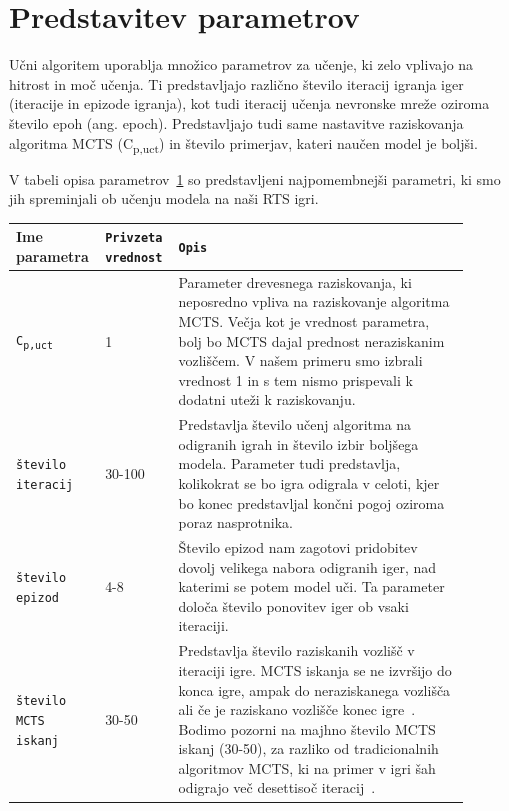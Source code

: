 \documentclass[a4paper, 12pt]{book}
\begin{document}
{\section{Predstavitev parametrov}
\label{parametri}
Učni algoritem uporablja množico parametrov za učenje, ki zelo vplivajo na hitrost in moč učenja.
Ti predstavljajo različno število iteracij igranja iger (iteracije in epizode igranja), kot tudi iteracij učenja nevronske mreže oziroma število epoh (ang. epoch).
Predstavljajo tudi same nastavitve raziskovanja algoritma MCTS (C\textsubscript{p,uct}) in število primerjav, kateri naučen model je boljši.

V tabeli opisa parametrov~\ref{tableParameters1} so predstavljeni najpomembnejši parametri, ki smo jih spreminjali ob učenju modela na naši RTS igri.
\begin{table}
	\begin{center}
		\begin{tabular}{p{0.15\linewidth}|p{0.13\linewidth}|p{0.62\linewidth}}
			Ime parametra                             & {\tt Privzeta vrednost} & {\tt Opis} \\ \hline
			{\tt C\textsubscript{p,uct}}               & 1 						& Parameter drevesnega raziskovanja, ki neposredno vpliva na raziskovanje algoritma MCTS. 
																				  Večja kot je vrednost parametra, bolj bo MCTS dajal prednost neraziskanim vozliščem. 
																				  V našem primeru smo izbrali vrednost 1 in s tem nismo prispevali k dodatni uteži k raziskovanju.\\
			{\tt število iteracij}                    & 30-100				    & Predstavlja število učenj algoritma na odigranih igrah in število izbir boljšega modela.
																				  Parameter tudi predstavlja, kolikokrat se bo igra odigrala v celoti, kjer bo konec predstavljal končni pogoj oziroma poraz nasprotnika.\\
			{\tt število epizod}                      & 4-8 					& Število epizod nam zagotovi pridobitev dovolj velikega nabora odigranih iger, nad katerimi se potem model uči.
																				  Ta parameter določa število ponovitev iger ob vsaki iteraciji.\\
			{\tt število MCTS iskanj}                 & 30-50					& Predstavlja število raziskanih vozlišč v iteraciji igre. 
														 						  MCTS iskanja se ne izvršijo do konca igre, ampak do neraziskanega vozlišča ali če je raziskano vozlišče konec igre~\cite{silver2018general}.
														 						  Bodimo pozorni na majhno število MCTS iskanj (30-50), za razliko od tradicionalnih algoritmov MCTS, ki na primer v igri šah odigrajo več desettisoč iteracij~\cite{kohne}.\\ 
		\end{tabular}
	\end{center}
	\label{tableParameters1}
\end{table}

}
\end{document}
